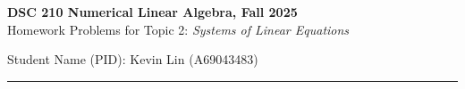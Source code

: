 \documentclass[11pt,letterpaper]{article}
\begin{document}
\pagestyle{plain}


 
\begin{center}
\textbf{\Large DSC 210 Numerical Linear Algebra, Fall 2025} \\ \bigskip
\large{Homework Problems for Topic 2: \textit{Systems of Linear Equations}} \\  \bigskip
\begin{flushleft}
    \large{Student Name (PID): Kevin Lin (A69043483)}
\end{flushleft}
\end{center}
\vspace{-4mm}
\rule{\linewidth}{0.1mm}

\bigskip
\end{document}
